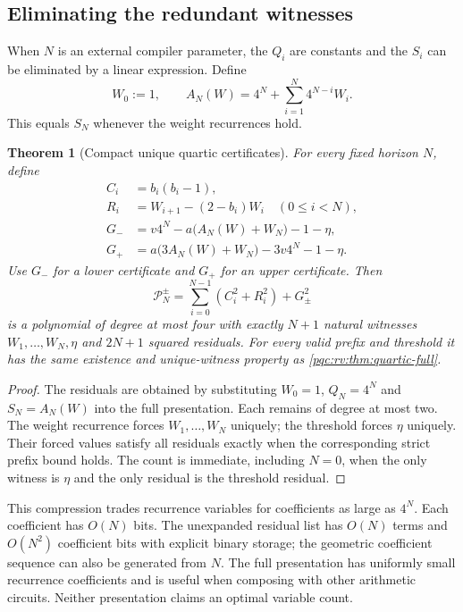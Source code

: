 \documentclass[11pt,letterpaper]{article}
\numberwithin{equation}{section}
\newtheorem{theorem}{Theorem}[section]
\theoremstyle{definition}
\theoremstyle{remark}
\begin{document}
\subsection{Eliminating the redundant witnesses}
When $N$ is an external compiler parameter, the $Q_i$ are constants
and the $S_i$ can be eliminated by a linear expression. Define
\begin{equation}\label{pqc:rv:eq:AN}
 W_0:=1,\qquad
 A_N(W)=4^N+\sum_{i=1}^N4^{N-i}W_i.
\end{equation}
This equals $S_N$ whenever the weight recurrences hold.

\begin{theorem}[Compact unique quartic certificates]\label{pqc:rv:thm:compact}
For every fixed horizon $N$, define
\begin{align}
 C_i&=b_i(b_i-1),\nonumber\\
 R_i&=W_{i+1}-(2-b_i)W_i\quad(0\leq i<N),\label{pqc:rv:eq:compact-res}\\
 G_-&=v4^N-a\bigl(A_N(W)+W_N\bigr)-1-\eta,\nonumber\\
 G_+&=a\bigl(3A_N(W)+W_N\bigr)-3v4^N-1-\eta.\nonumber
\end{align}
Use $G_-$ for a lower certificate and $G_+$ for an upper certificate.
Then
\begin{equation}\label{pqc:rv:eq:compact-poly}
 \mathcal P_N^{\pm}=\sum_{i=0}^{N-1}(C_i^2+R_i^2)+G_{\pm}^2
\end{equation}
is a polynomial of degree at most four with exactly $N+1$ natural
witnesses $W_1,\ldots,W_N,\eta$ and $2N+1$ squared residuals.
For every valid prefix and threshold it has the same existence and
unique-witness property as \cref{pqc:rv:thm:quartic-full}.
\end{theorem}
\begin{proof}
The residuals are obtained by substituting $W_0=1$, $Q_N=4^N$ and
$S_N=A_N(W)$ into the full presentation. Each remains of degree at
most two. The weight recurrence forces $W_1,\ldots,W_N$ uniquely;
the threshold forces $\eta$ uniquely. Their forced values satisfy
all residuals exactly when the corresponding strict prefix bound
holds. The count is immediate, including $N=0$, when the only
witness is $\eta$ and the only residual is the threshold residual.
\end{proof}

This compression trades recurrence variables for coefficients as large
as $4^N$. Each coefficient has $O(N)$ bits. The unexpanded residual list has
$O(N)$ terms and $O(N^2)$ coefficient bits with explicit binary storage;
the geometric coefficient sequence can also be generated from $N$.
The full presentation has uniformly small recurrence coefficients and
is useful when composing with other arithmetic circuits. Neither
presentation claims an optimal variable count.
\end{document}
